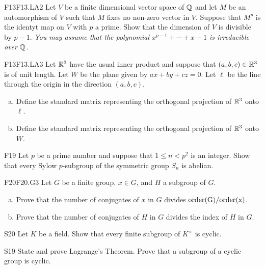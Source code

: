 \documentclass[../AlgebraQualSolutions.tex]{subfiles}
\begin{document}
	\begin{prob}{F13}{F13.LA2}
		Let $V$ be a finite dimensional vector space of $\mathbb{Q}$ and let $M$ be an automorphism of $V$ such that $M$ fixes no non-zero vector in $V$. Suppose that $M^p$ is the identyt map on $V$ with $p$ a prime. Show that the dimension of $V$ is divisible by $p-1$. \emph{ You may assume that the polynomial $x^{p-1} + \cdots + x + 1$ is irreducible  over $\mathbb{Q}$.}
	\end{prob}

	\begin{prob}{F13}{F13.LA3}
		Let $\mathbb{R}^3$ have  the usual inner product and suppose that $(a,b,c) \in \mathbb{R}^3$ is of unit length. Let $W$ be the plane given by $ax + by + cz = 0$. Let $\ell$ be the line through the origin in the direction $(a,b,c)$.
		\begin{enumerate}[(a)]
			\item Define the standard matrix representing the orthogonal projection of $\mathbb{R}^3$ onto $\ell$.
			\item Define the standard matrix representing the orthogonal projection of $\mathbb{R}^3$ onto $W$.
		\end{enumerate}
	\end{prob}

	\begin{prob}{F19}{}
	Let $p$ be a prime number and suppose that $1 \leq n <p^2$ is an integer. Show that every Sylow $p$-subgroup of the symmetric group $S_n$ is abelian.
	\end{prob}
	

	\begin{prob}{F20}{F20.G3}
	Let $G$ be a finite group, $x \in G$, and $H$ a subgroup of $G$.
	\begin{enumerate}[(a)]
	\item Prove that the number of conjugates of $x$ in $G$ divides $\rm{order}(G)/\rm{order}(x)$.
	\item Prove that the number of conjugates of $H$ in $G$ divides the index of $H$ in $G$.
	\end{enumerate}
	\end{prob}

	\begin{prob}{S20}{}
	Let $K$ be a field. Show that every finite subgroup of $K^\times$ is cyclic.
	\end{prob}

	\begin{prob}{S19}{}
	State and prove Lagrange's Theorem. Prove that a subgroup of a cyclic group is cyclic.
	\end{prob}
\end{document}
